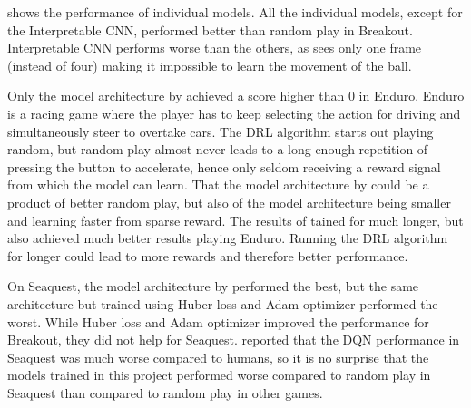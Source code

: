  shows the performance of individual models. All the individual models, except for the Interpretable CNN, performed better than random play in Breakout. Interpretable CNN performs worse than the others, as sees only one frame (instead of four) making it impossible to learn the movement of the ball.

Only the model architecture by \textcite{mnih_playing_2013} achieved a score higher than 0 in Enduro. Enduro is a racing game where the player has to keep selecting the action for driving and simultaneously steer to overtake cars. The DRL algorithm starts out playing random, but random play almost never leads to a long enough repetition of pressing the button to accelerate, hence only seldom receiving a reward signal from which the model can learn. That the model architecture by \textcite{mnih_playing_2013} could be a product of better random play, but also of the model architecture being smaller and learning faster from sparse reward. The results of \textcite{mnih_playing_2013,mnih_human-level_2015} tained for much longer, but also achieved much better results playing Enduro. Running the DRL algorithm for longer could lead to more rewards and therefore better performance. 

On Seaquest, the model architecture by \textcite{mnih_human-level_2015} performed the best, but the same architecture but trained using Huber loss and Adam optimizer performed the worst. While Huber loss and Adam optimizer improved the performance for Breakout, they did not help for Seaquest. \textcite{mnih_playing_2013} reported that the DQN performance in Seaquest was much worse compared to humans, so it is no surprise that the models trained in this project performed worse compared to random play in Seaquest than compared to random play in other games.


